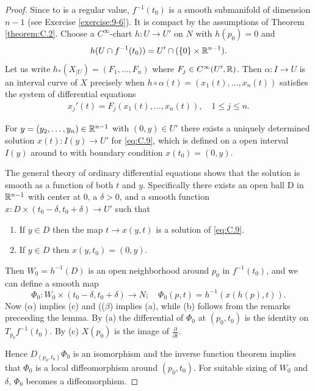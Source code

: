 \begin{proof}
  Since to is a regular value, $f^{-1}(t_0)$ is a smooth submanifold of dimension $n-1$ (see Exercise \ref{exercise:9-6}). 
  It is compact by the assumptions of Theorem \ref{theorem:C.2}. Choose a $C^\infty$-chart $h:U\to U'$ on $N$ 
  with $h(p_0) = 0$ and
  \[
    h(U\cap f^{-1}(t_0)) = U'\cap (\{0\}\times {\ensuremath{\mathbb{R}}}^{n-1}).
  \]
  Let us write $h_*(X_{|U}) = (F_1, \ldots, F_n)$ where $F_j\in C^\infty(U', {\mathbb{R}})$. Then $\alpha:I\to U$
  is an interval curve of $X$ precisely when $h\circ \alpha(t)=(x_1(t),\ldots,x_n(t))$ satisfies the system of 
  differential equations
  \begin{align}\label{eq:C.9}
    x_j'(t) = F_j(x_1(t),\ldots,x_n(t)),\quad 1\le j\le n.
  \end{align}

  For $y = (y_2,\ldots,y_n)\in {\ensuremath{\mathbb{R}}}^{n-1}$ with $(0, y)\in U'$ there exists a uniquely determined
  solution $x(t):I(y)\to U'$ for \eqref{eq:C.9}, which is defined on a open interval $I(y)$ around
  to with boundary condition $x(t_0) = (0, y)$.

  The general theory of ordinary differential equations shows that the solution is
  smooth as a function of both $t$ and $y$. Specifically there exists an open ball D in
  ${\mathbb{R}}^{n-1}$ with center at 0, a $\delta>0$, and a smooth function $x:D\times(t_0-\delta, t_0+\delta)\to U'$
  such that
  \begin{enumerate}
    \item[($\alpha$)] If $y\in D$ then the map $t\to x(y, t)$ is a solution of \eqref{eq:C.9}.
    \item[($\beta$)] If $y\in D$ then $x(y, t_0) = (0, y)$.
  \end{enumerate}
  Then $W_0=h^{-1}(D)$ is an open neighborhood around $p_0$ in $f^{-1}(t_0)$, and we can define 
  a smooth map
  \[
    \Phi_0:W_0\times (t_0-\delta, t_0+\delta)\to N;\quad 
    \Phi_0(p, t) = h^{-1}(x(h(p), t)).
  \]
  Now ($\alpha$) implies (c) and (($\beta$) implies (a), while (b) follows from the remarks
  preceeding the lemma. By (a) the differential of $\Phi_0$ at $(p_0, t_0)$ is the identity on
  $T_{p_0}f^{-1}(t_0)$. By (c) $X(p_0)$ is the image of $\frac{\partial }{\partial t}$.

  Hence $D_{(p_0, t_0)}\Phi_0$ is an isomorphism and the inverse function theorem implies that
  $\Phi_0$ is a local diffeomorphism around $(p_0, t_0)$. For suitable sizing of $W_0$ and $\delta$, 
  $\Phi_0$ becomes a diffeomorphism.
\end{proof}

